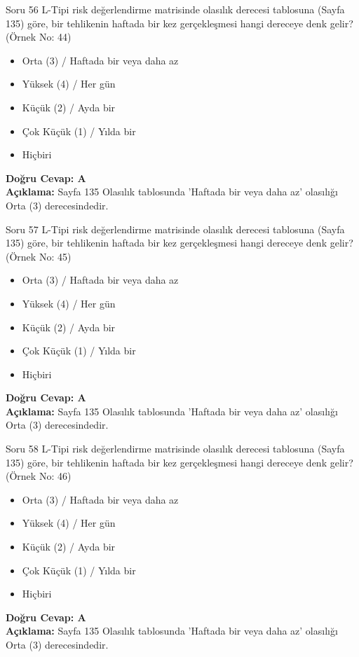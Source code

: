 \documentclass[12pt,a4paper]{article}
\begin{document}
\begin{testcard}{Soru 56}
    L-Tipi risk değerlendirme matrisinde olasılık derecesi tablosuna (Sayfa 135) göre, bir tehlikenin haftada bir kez gerçekleşmesi hangi dereceye denk gelir? (Örnek No: 44)
    \begin{itemize}
        \item[A)] Orta (3) / Haftada bir veya daha az
        \item[B)] Yüksek (4) / Her gün
        \item[C)] Küçük (2) / Ayda bir
        \item[D)] Çok Küçük (1) / Yılda bir
        \item[E)] Hiçbiri
    \end{itemize}
    \tcblower
    \textbf{Doğru Cevap: A} \\
    \textbf{Açıklama:} Sayfa 135 Olasılık tablosunda 'Haftada bir veya daha az' olasılığı Orta (3) derecesindedir.
\end{testcard}

\begin{testcard}{Soru 57}
    L-Tipi risk değerlendirme matrisinde olasılık derecesi tablosuna (Sayfa 135) göre, bir tehlikenin haftada bir kez gerçekleşmesi hangi dereceye denk gelir? (Örnek No: 45)
    \begin{itemize}
        \item[A)] Orta (3) / Haftada bir veya daha az
        \item[B)] Yüksek (4) / Her gün
        \item[C)] Küçük (2) / Ayda bir
        \item[D)] Çok Küçük (1) / Yılda bir
        \item[E)] Hiçbiri
    \end{itemize}
    \tcblower
    \textbf{Doğru Cevap: A} \\
    \textbf{Açıklama:} Sayfa 135 Olasılık tablosunda 'Haftada bir veya daha az' olasılığı Orta (3) derecesindedir.
\end{testcard}

\begin{testcard}{Soru 58}
    L-Tipi risk değerlendirme matrisinde olasılık derecesi tablosuna (Sayfa 135) göre, bir tehlikenin haftada bir kez gerçekleşmesi hangi dereceye denk gelir? (Örnek No: 46)
    \begin{itemize}
        \item[A)] Orta (3) / Haftada bir veya daha az
        \item[B)] Yüksek (4) / Her gün
        \item[C)] Küçük (2) / Ayda bir
        \item[D)] Çok Küçük (1) / Yılda bir
        \item[E)] Hiçbiri
    \end{itemize}
    \tcblower
    \textbf{Doğru Cevap: A} \\
    \textbf{Açıklama:} Sayfa 135 Olasılık tablosunda 'Haftada bir veya daha az' olasılığı Orta (3) derecesindedir.
\end{testcard}
\end{document}
